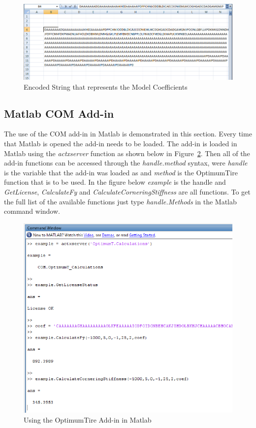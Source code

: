 \begin{figure}[H]
	\centering
		\includegraphics[width=1.0\textwidth]{AddinEncodedCoefficient.png}
	\caption{Encoded String that represents the Model Coefficients}
	\label{fig:AddinEncodedCoefficient}
\end{figure}


\subsection{Matlab COM Add-in}
\label{sec:OptimumTAddin:COMMatlab}

The use of the COM add-in in Matlab is demonstrated in this section. Every time that Matlab is opened the add-in needs to be loaded. The add-in is loaded in Matlab using the \textit{actxserver} function as shown below in Figure~\ref{fig:MatlabAddin}. Then all of the add-in functions can be accessed through the \textit{handle.method} syntax, were \textit{handle} is the variable that the add-in was loaded as and \textit{method} is the OptimumTire function that is to be used. In the figure below \textit{example} is the handle and \textit{GetLicense}, \textit{CalculateFy} and \textit{CalculateCorneringStiffness} are all functions. To get the full list of the available functions just type \textit{handle.Methods} in the Matlab command window.

\begin{figure}[H]
	\centering
		\includegraphics[width=1.0\textwidth]{MatlabAddin.png}
	\caption{Using the OptimumTire Add-in in Matlab}
	\label{fig:MatlabAddin}
\end{figure}

